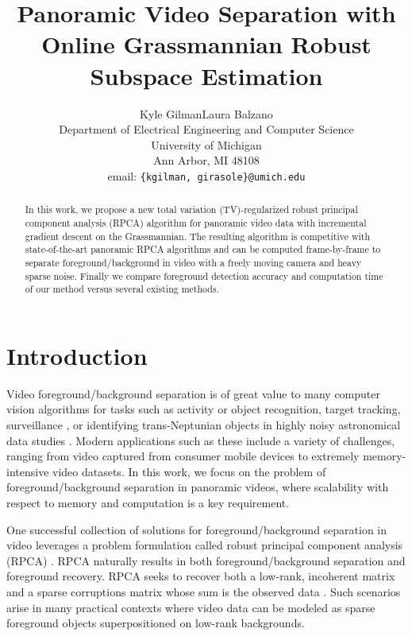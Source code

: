 \documentclass[10pt,twocolumn,letterpaper]{article}
\begin{document}
\title{Panoramic Video Separation with Online Grassmannian Robust Subspace Estimation}

\author{Kyle Gilman\qquad Laura Balzano\\Department of Electrical Engineering and Computer Science \\ University of Michigan \\ Ann Arbor, MI 48108 \\ email: \texttt{\{kgilman, girasole\}@umich.edu}}

\maketitle
\thispagestyle{plain}
\pagestyle{plain}

\begin{abstract}

In this work, we propose a new total variation (TV)-regularized robust principal component analysis (RPCA) algorithm for panoramic video data with incremental gradient descent on the Grassmannian. The resulting algorithm is competitive with state-of-the-art panoramic RPCA algorithms and can be computed frame-by-frame to separate foreground/background in video with a freely moving camera and heavy sparse noise.  Finally we compare foreground detection accuracy and computation time of our method versus several existing methods.
\end{abstract}

\section{Introduction}

Video foreground/background separation is of great value to many computer vision algorithms for tasks such as activity or object recognition, target tracking, surveillance \cite{rpca_image_and_video_processiing}, or identifying trans-Neptunian objects in highly noisy astronomical data studies \cite{Gonzalez}. Modern applications such as these include a variety of challenges, ranging from video captured from consumer mobile devices to extremely memory-intensive video datasets. In this work, we focus on the problem of foreground/background separation in panoramic videos, where scalability with respect to memory and computation is a key requirement.

One successful collection of solutions for foreground/background separation in video leverages a problem formulation called robust principal component analysis (RPCA) \cite{wright2009robust}. RPCA naturally results in both foreground/background separation and foreground recovery. %
RPCA seeks to recover both a low-rank, incoherent matrix and a sparse corruptions matrix whose sum is the observed data \cite{Bouwmans_survey}. Such scenarios arise in many practical contexts where video data can be modeled as sparse foreground objects superpositioned on low-rank backgrounds. 
\end{document}

